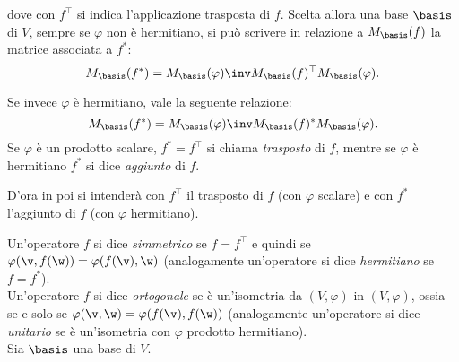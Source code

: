 \documentclass[10pt,landscape]{article}
\begin{document}
\begin{multicols}{3}
		dove con $f^\top$ si indica l'applicazione trasposta di $f$. Scelta allora una
		base $\basis$ di $V$, sempre se $\varphi$ non è hermitiano, si può scrivere in relazione a $M_\basis(f)$ la
		matrice associata a $f^*$:
		\[ M_\basis(f^*) = M_\basis(\varphi)\inv M_\basis(f)^\top M_\basis(\varphi). \]
		
		Se invece $\varphi$ è hermitiano, vale la seguente relazione:
		\[ M_\basis(f^*) = M_\basis(\varphi)\inv M_\basis(f)^* M_\basis(\varphi). \]
		Se $\varphi$ è un prodotto scalare, $f^* = f^\top$ si chiama \textit{trasposto}
		di $f$, mentre se $\varphi$ è hermitiano $f^*$ si dice \textit{aggiunto} di $f$.

		D'ora in poi si intenderà con $f^\top$ il trasposto di $f$ (con $\varphi$ scalare) e con $f^*$ l'aggiunto di $f$ (con $\varphi$ hermitiano). \\ \vskip 0.05in
		
		Un'operatore $f$ si dice \textit{simmetrico} se $f = f^\top$ e quindi se $\varphi(\v, f(\w)) = \varphi(f(\v), \w)$ (analogamente un'operatore si dice \textit{hermitiano} se $f = f^*$). \\
		
		Un'operatore $f$ si dice \textit{ortogonale} se è un'isometria da
		$(V, \varphi)$ in $(V, \varphi)$, ossia se e solo se $\varphi(\v, \w) = \varphi(f(\v), f(\w))$ (analogamente un'operatore si dice \textit{unitario} se è un'isometria con
		$\varphi$ prodotto hermitiano). \\
		
		Sia $\basis$ una base di $V$.
		

\end{multicols}
\end{document}
